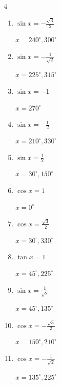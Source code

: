 \begin{multicols}{4}
\begin{enumerate}
        $\displaystyle x = 0^{\circ} , 180^{\circ}$

  \item $\displaystyle \sin{x}  = -\frac{\sqrt{3}}{2}$

        $\displaystyle x = 240^{\circ} , 300^{\circ}$

  \item $\displaystyle \sin{x}  = -\frac{1}{\sqrt{2}}$

        $\displaystyle x = 225^{\circ} , 315^{\circ}$

  \item $\displaystyle \sin{x}  = -1$

        $\displaystyle x = 270^{\circ}$

  \item $\displaystyle \sin{x}  = -\frac{1}{2}$

        $\displaystyle x = 210^{\circ} , 330^{\circ}$

  \item $\displaystyle \sin{x}  = \frac{1}{2}$

        $\displaystyle x = 30^{\circ} , 150^{\circ}$

  \item $\displaystyle \cos{x}  = 1$

        $\displaystyle x = 0^{\circ}$

  \item $\displaystyle \cos{x}  = \frac{\sqrt{3}}{2}$

        $\displaystyle x = 30^{\circ} , 330^{\circ}$

  \item $\displaystyle \tan{x}  = 1$

        $\displaystyle x = 45^{\circ} , 225^{\circ}$

  \item $\displaystyle \sin{x}  = \frac{1}{\sqrt{2}}$

        $\displaystyle x = 45^{\circ} , 135^{\circ}$

\columnbreak %

\resetques

  \item $\displaystyle \cos{x}  = -\frac{\sqrt{3}}{2}$

        $\displaystyle x = 150^{\circ} , 210^{\circ}$

  \item $\displaystyle \cos{x}  = -\frac{1}{\sqrt{2}}$

        $\displaystyle x = 135^{\circ} , 225^{\circ}$


\end{enumerate}
\end{multicols}

